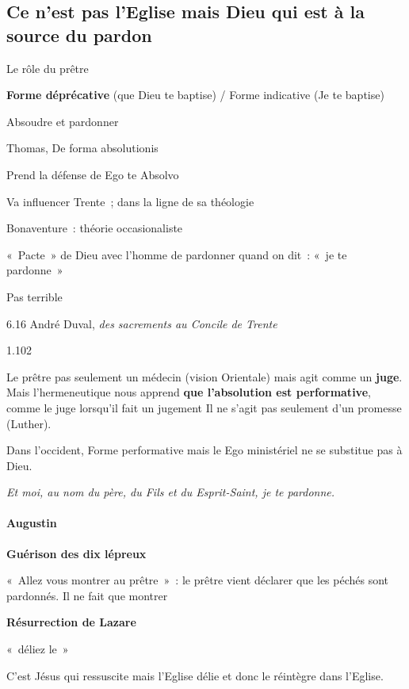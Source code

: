 \hypertarget{ce-nest-pas-leglise-mais-dieu-qui-est-uxe0-la-source-du-pardon}{%
\subsection{Ce n'est pas l'Eglise mais Dieu qui est à la source du
pardon}\label{ce-nest-pas-leglise-mais-dieu-qui-est-uxe0-la-source-du-pardon}}

Le rôle du prêtre

\textbf{Forme déprécative} (que Dieu te baptise) / Forme indicative (Je
te baptise)

Absoudre et pardonner

Thomas, De forma absolutionis

Prend la défense de Ego te Absolvo

Va influencer Trente~; dans la ligne de sa théologie

Bonaventure~: théorie occasionaliste

«~Pacte~» de Dieu avec l'homme de pardonner quand on dit~: «~je te
pardonne~»

Pas terrible

6.16 André Duval, \emph{des sacrements au Concile de Trente}

1.102

Le prêtre pas seulement un médecin (vision Orientale) mais agit comme un
\textbf{juge}. Mais l'hermeneutique nous apprend \textbf{que
l'absolution est performative}, comme le juge lorsqu'il fait un jugement
Il ne s'agit pas seulement d'un promesse (Luther).

Dans l'occident, Forme performative mais le Ego ministériel ne se
substitue pas à Dieu.

\emph{Et moi, au nom du père, du Fils et du Esprit-Saint, je te
pardonne.}

\hypertarget{augustin}{%
\paragraph{Augustin}\label{augustin}}

\textbf{Guérison des dix lépreux}

«~Allez vous montrer au prêtre~»~: le prêtre vient déclarer que les
péchés sont pardonnés. Il ne fait que montrer

\textbf{Résurrection de Lazare}

«~déliez le~»

C'est Jésus qui ressuscite mais l'Eglise délie et donc le réintègre dans
l'Eglise.

